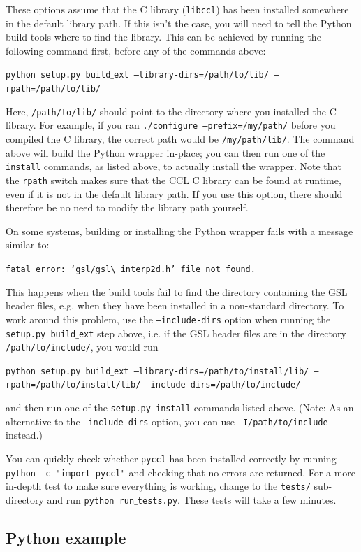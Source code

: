 \documentclass[\docopts]{\docclass}
\begin{document}
These options assume that the C library ({\tt libccl}) has been installed somewhere in the default library path. If this isn't the case, you will need to tell the Python build tools where to find the library. This can be achieved by running the following command first, before any of the commands above:

\texttt{python setup.py build$\_$ext --library-dirs=/path/to/lib/ --rpath=/path/to/lib/}

Here, {\tt /path/to/lib/} should point to the directory where you installed the C library. For example, if you ran {\tt ./configure --prefix=/my/path/} before you compiled the C library, the correct path would be {\tt /my/path/lib/}. The command above will build the Python wrapper in-place; you can then run one of the {\tt install} commands, as listed above, to actually install the wrapper. Note that the {\tt rpath} switch makes sure that the CCL C library can be found at runtime, even if it is not in the default library path. If you use this option, there should therefore be no need to modify the library path yourself.

On some systems, building or installing the Python wrapper fails with a message similar to:

\texttt{fatal error: `gsl/gsl$\_$interp2d.h' file not found.}

This happens when the build tools fail to find the directory containing the GSL header files, e.g. when they have been installed in a non-standard directory. To work around this problem, use the {\tt --include-dirs} option when running the {\tt setup.py build$\_$ext} step above, i.e. if the GSL header files are in the directory {\tt /path/to/include/}, you would run

\texttt{python setup.py build$\_$ext --library-dirs=/path/to/install/lib/ --rpath=/path/to/install/lib/ --include-dirs=/path/to/include/}

and then run one of the {\tt setup.py install} commands listed above. (Note: As an alternative to the {\tt --include-dirs} option, you can use {\tt -I/path/to/include} instead.)

You can quickly check whether {\tt pyccl} has been installed correctly by running {\tt python -c "import pyccl"} and checking that no errors are returned. For a more in-depth test to make sure everything is working, change to the {\tt tests/} sub-directory and run {\tt python run$\_$tests.py}. These tests will take a few minutes.

\subsection{Python example}
\label{sec:python:example}
\end{document}
